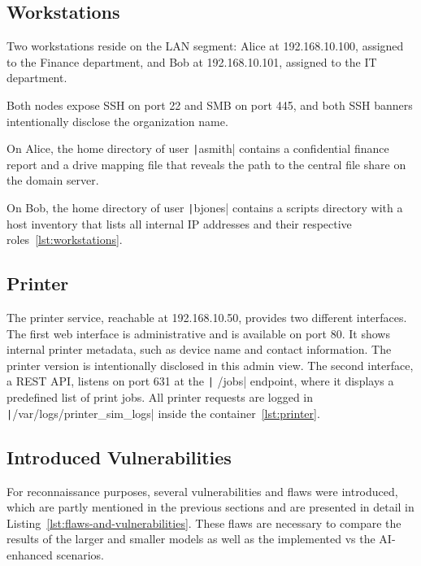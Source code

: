\subsection{Workstations}\label{subsec:workstations}

Two workstations reside on the LAN segment: Alice at 192.168.10.100, assigned to the Finance department, and Bob at 192.168.10.101, assigned to the IT department.

Both nodes expose \gls{SSH} on port 22 and \gls{SMB} on port 445, and both \gls{SSH} banners intentionally disclose the organization name.

On Alice, the home directory of user \texttt|asmith| contains a confidential finance report and a drive mapping file that reveals the path to the central file share on the domain server.

On Bob, the home directory of user \texttt|bjones| contains a scripts directory with a host inventory that lists all internal IP addresses and their respective roles~\ref{lst:workstations}.

\subsection{Printer}\label{subsec:reproducible-test-environment-printer}

The printer service, reachable at 192.168.10.50, provides two different interfaces.
The first web interface is administrative and is available on port 80.
It shows internal printer metadata, such as device name and contact information.
The printer version is intentionally disclosed in this admin view.
The second interface, a \gls{REST API}, listens on port 631 at the \texttt| {/jobs}| endpoint, where it displays a predefined list of print jobs.
All printer requests are logged in \\ \texttt|{/var/logs/printer_sim_logs}| inside the container~\ref{lst:printer}.


\subsection{Introduced Vulnerabilities}\label{introduced-vulnerabilities}

For reconnaissance purposes, several vulnerabilities and flaws were introduced, which are partly mentioned in the previous sections and are presented in detail in Listing~\ref{lst:flaws-and-vulnerabilities}. These flaws are necessary to compare the results of the larger and smaller models as well as the implemented vs the AI-enhanced scenarios.

